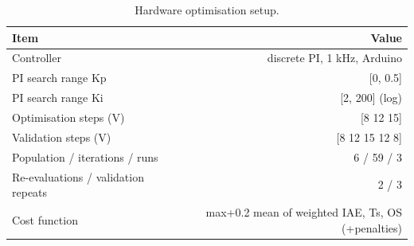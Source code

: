\begin{table}[t]
\centering\caption{Hardware optimisation setup.}\label{tab:hwsetup}
\begin{tabular}{lr}
\toprule
Item & Value \\
\midrule
Controller & discrete PI, 1 kHz, Arduino \\
PI search range Kp & [0, 0.5] \\
PI search range Ki & [2, 200] (log) \\
Optimisation steps (V) & [8 12 15] \\
Validation steps (V) & [8 12 15 12 8] \\
Population / iterations / runs & 6 / 59 / 3 \\
Re-evaluations / validation repeats & 2 / 3 \\
Cost function & max+0.2 mean of weighted IAE, Ts, OS (+penalties) \\
\bottomrule
\end{tabular}
\end{table}
